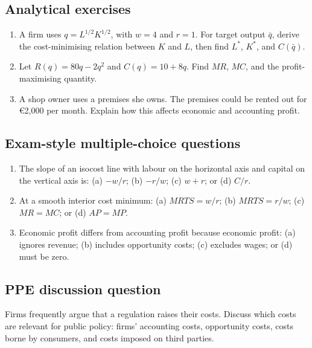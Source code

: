 \subsection*{Analytical exercises}
\begin{enumerate}[resume,label=\arabic*.]
  \item A firm uses $q=L^{1/2}K^{1/2}$, with $w=4$ and $r=1$. For target output $\bar q$, derive the cost-minimising relation between $K$ and $L$, then find $L^*$, $K^*$, and $C(\bar q)$.
  \item Let $R(q)=80q-2q^2$ and $C(q)=10+8q$. Find $MR$, $MC$, and the profit-maximising quantity.
  \item A shop owner uses a premises she owns. The premises could be rented out for \euro2,000 per month. Explain how this affects economic and accounting profit.
\end{enumerate}

\subsection*{Exam-style multiple-choice questions}
\begin{enumerate}[resume,label=\arabic*.]
  \item The slope of an isocost line with labour on the horizontal axis and capital on the vertical axis is: (a) $-w/r$; (b) $-r/w$; (c) $w+r$; or (d) $C/r$.
  \item At a smooth interior cost minimum: (a) $MRTS=w/r$; (b) $MRTS=r/w$; (c) $MR=MC$; or (d) $AP=MP$.
  \item Economic profit differs from accounting profit because economic profit: (a) ignores revenue; (b) includes opportunity costs; (c) excludes wages; or (d) must be zero.
\end{enumerate}

\subsection*{PPE discussion question}

\noindent Firms frequently argue that a regulation raises their costs. Discuss which costs are relevant for public policy: firms' accounting costs, opportunity costs, costs borne by consumers, and costs imposed on third parties.
